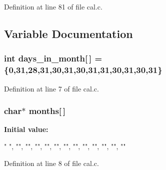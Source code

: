 Definition at line 81 of file cal.c.



\subsection{Variable Documentation}
\subsubsection[{days\_\-in\_\-month}]{\setlength{\rightskip}{0pt plus 5cm}int {\bf days\_\-in\_\-month}[$\,$] = \{0,31,28,31,30,31,30,31,31,30,31,30,31\}}\label{cal_8c_aeb7a5fa5e4ed1e40440c1eaf4cbc06c1}


Definition at line 7 of file cal.c.

\subsubsection[{months}]{\setlength{\rightskip}{0pt plus 5cm}char$\ast$ {\bf months}[$\,$]}\label{cal_8c_a9878e6d5a52b0b77dd7857ae80601910}
{\bfseries Initial value:}
\begin{DoxyCode}

{
        " ",
        "\n\n\nJanuary",
        "\n\n\nFebruary",
        "\n\n\nMarch",
        "\n\n\nApril",
        "\n\n\nMay",
        "\n\n\nJune",
        "\n\n\nJuly",
        "\n\n\nAugust",
        "\n\n\nSeptember",
        "\n\n\nOctober",
        "\n\n\nNovember",
        "\n\n\nDecember"
}
\end{DoxyCode}


Definition at line 8 of file cal.c.

